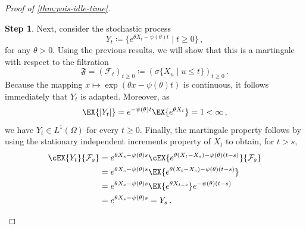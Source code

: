 \documentclass[titlepage]{article}
\theoremstyle{plain}
\theoremstyle{definition}
\newtheorem{proofpart}{Step}
\begin{document}
\begin{proof}[Proof of \cref{thm:pois-idle-time}]
  \begin{proofpart}
    Next, consider the stochastic process
    \begin{equation}
      Y_t \coloneqq \{ e^{\theta X_t - \psi(\theta) t} \mid t \geq 0 \} \,,
    \end{equation}
    for any $\theta > 0$. Using the previous results, we will show that this is a martingale with respect to the filtration
    \begin{equation}
      \mathfrak{F} = \left( \mathcal{F}_t \right)_{t \geq 0} \coloneqq \left( \sigma \{X_u \mid u \leq t\} \right)_{t \geq 0} \,.
    \end{equation}
    Because the mapping $x \mapsto \exp{(\theta x - \psi(\theta) t)}$ is continuous, it follows immediately that $Y_t$ is adapted. Moreover, as
    \begin{equation}
      \EX{\vert Y_t \vert} = e^{-\psi(\theta) t} \EX{e^{\theta X_t}} = 1 < \infty \,,
    \end{equation}
    we have $Y_t \in L^1(\Omega)$ for every $t \geq 0$. Finally, the martingale property follows by using the stationary independent increments property of $X_t$ to obtain, for $t > s$,
    \begin{equation} \label{eq:martingale-property}
      \begin{aligned}
        \cEX{Y_t}{\mathcal{F}_s} & = e^{\theta X_s - \psi(\theta) s} \cEX{e^{\theta (X_t - X_s) - \psi(\theta) (t - s)}}{\mathcal{F}_s} \\
                                & = e^{\theta X_s - \psi(\theta) s} \EX{e^{\theta (X_t - X_s) - \psi(\theta) (t - s)}}                 \\
                                & = e^{\theta X_s - \psi(\theta) s} \EX{e^{\theta X_{t - s}}} e^{-\psi(\theta) (t - s)}                \\
                                & = e^{\theta X_s - \psi(\theta) s} = Y_s \,.
      \end{aligned}
    \end{equation}
  \end{proofpart}


\end{proof}
\end{document}
